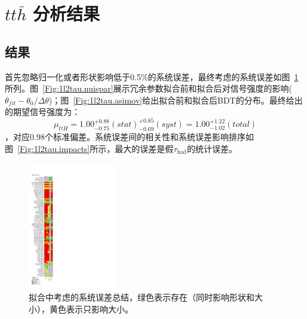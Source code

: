 \section{$tt\bar{h}$ 分析结果}\label{sec:ttH_results}
\subsection{\ltwotau 结果}
首先忽略归一化或者形状影响低于0.5\%的系统误差，最终考虑的系统误差如图~\ref{Fig:1l2tau.pruning}所列。图~\ref{Fig:1l2tau.nuispar}展示冗余参数拟合前和拟合后对信号强度的影响($\theta_{fit}-\theta_{0}/\Delta\theta$)；图~\ref{Fig:1l2tau.asimov}给出拟合前和拟合后BDT的分布。最终给出的期望信号强度为：$$\mu_{ttH}=1.00^{+0.88}_{-0.75}(stat)^{+0.85}_{-0.69}(syst)=1.00^{+1.22}_{-1.02}(total)$$，对应0.98个标准偏差。系统误差间的相关性和系统误差影响排序如图~\ref{Fig:1l2tau.impacts}所示，最大的误差是假$\tau_{\text{had}}$的统计误差。

\begin{figure}[htbp]
\centering
\begin{center}
\includegraphics[width=0.35\textwidth, height=0.8\textheight]{fig/OneLepTwoTaus/Pruning.pdf}
\end{center}
\caption{\ltwotau 拟合中考虑的系统误差总结，绿色表示存在（同时影响形状和大小），黄色表示只影响大小。}
\label{Fig:1l2tau.pruning}
\end{figure}

